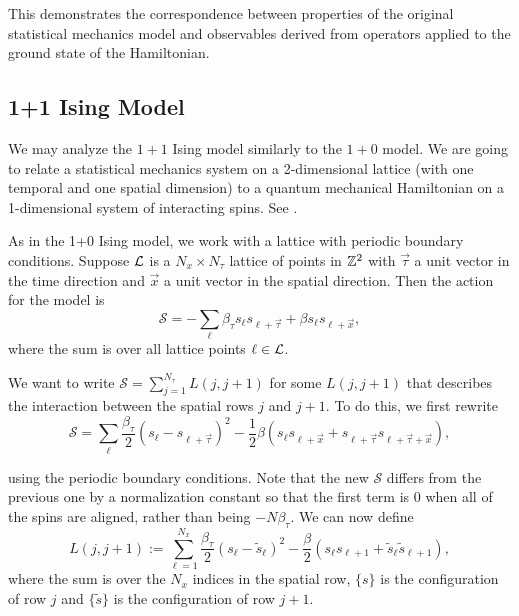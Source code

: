 \documentclass[10pt,reqno]{amsart}
\begin{document}
	This demonstrates the correspondence between properties of the original statistical mechanics model and observables derived from operators applied to the ground state of the Hamiltonian.
	
	\subsection{1+1 Ising Model}
	
	We may analyze the $1+1$ Ising model similarly to the $1+0$ model. 
	We are going to relate a statistical mechanics system on a 2-dimensional lattice (with one temporal and one spatial dimension) to a quantum mechanical Hamiltonian on a 1-dimensional system of interacting spins.  
	See \cite{FradkinSusskind78,KogutGaugeSummary}.
	
	As in the 1+0 Ising model, we work with a lattice with periodic boundary conditions. 
	Suppose $\mathcal{L}$ is a $N_x \times N_\tau$ lattice of points in $\mathbb{Z}^2$ with $\vec{\tau}$ a unit vector in the time direction and $\vec{x}$ a unit vector in the spatial direction. 
	Then the action for the model is 
	\[ \mathcal{S}= -\sum_{\ell} \beta_\tau s_{\ell}s_{\ell+\vec{\tau}}+\beta s_{\ell}s_{\ell+\vec{x}}, \]
	where the sum is over all lattice points $\ell \in \mathcal{L}$.
	
	We want to write $\mathcal{S}=\sum_{j=1}^{N_\tau} L(j,j+1)$ for some $L(j,j+1)$ that describes the interaction between the spatial rows $j$ and $j+1$.
	To do this, we first rewrite 
	\[\mathcal{S}=\sum_{\ell}\frac{\beta_\tau}{2}(s_{\ell}-s_{\ell+\vec{\tau}})^2 -\frac{1}{2}\beta (s_\ell s_{\ell+\vec{x}}+s_{\ell+\vec{\tau}}s_{\ell+\vec{\tau}+\vec{x}}), \]
	
	using the periodic boundary conditions. 
	Note that the new $\mathcal{S}$ differs from the previous one by a normalization constant so that the first term is 0 when all of the spins are aligned, rather than being $-N\beta_\tau$.
	We can now define 
	\[L(j,j+1):= \sum_{\ell=1}^{N_x} \frac{\beta_\tau}{2} (s_\ell-\tilde{s}_\ell)^2-\frac{\beta}{2}(s_\ell s_{\ell+1}+\tilde{s}_\ell \tilde{s}_{\ell+1}), \]
	where the sum is over the $N_x$ indices in the spatial row, $\{s\}$ is the configuration of row $j$ and $\{\tilde{s}\}$ is the configuration of row $j+1$.
	
\end{document}
